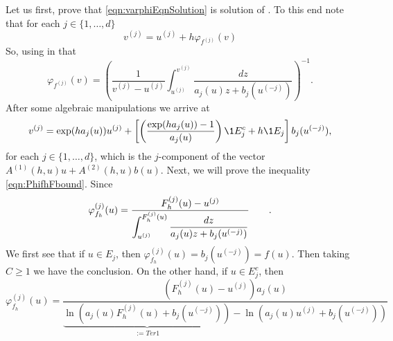 \documentclass[3p]{elsarticle}
\theoremstyle{definition}
\theoremstyle{plain}%
\theoremstyle{remark}
\newcommand{\SM}{LS\xspace}
\begin{document}
\begin{pf}
	Let us first, prove that \eqref{eqn:varphiEqnSolution} is solution of . To this end note 
	that for each $j\in \{1,\dots, d\}$
	\begin{equation*}
		v^{(j)} = u^{(j)} + h \varphi_{f^{(j)}}(v)	
	\end{equation*}
	So, using in   that
	\begin{equation}
		\varphi_{f^{(j)}}(v) =
			\left(
				\frac{1}{v^{(j)}-u^{(j)}}
				\int 
				_{u^{(j)}}^{v^{(j)}}
				\frac{dz}
				{
					a_{j}(u) z
					+b_{j}(u^{(-j)})
				}
				\right)^{-1}.
	\end{equation} 
	After some algebraic manipulations we arrive at
%	
	\begin{equation}
		v^{(j)}= \exp(h a_j(u)) u^{(j)} + 
		\left[
			\left(
				\frac{\exp(ha_j(u))-1}{a_j(u)}
			\right)
			\1{E_j^c}
			+h \1{E_j}
		\right]b_{j}(u^{(-j)}),
	\end{equation}	
	for each $j\in \{1,\dots, d\}$, which is the $j$-component of the vector
	$A^{(1)}(h,u)u +A^{(2)}(h,u) b(u)$.
	Next, we will prove the inequality \eqref{eqn:PhifhFbound}. Since 
	$$
		\varphi_{f_h}^{(j)}(u) = 
			\frac{
				F_h^{(j)}(u)-u^{(j)}
			}%
			{%
				\displaystyle
				\int_{u^{(j)}}^{F_h^{(j)}(u)}
				\frac{dz}{a_j(u)z + b_j(u^{(-j)})}
			} \qquad.
	$$
	We first see that if $u\in E_j$, then 
	$
		\varphi_{f_h}^{(j)}(u) = b_j(u^{(-j)}) = f(u).
	$
	Then taking $C\geq 1$ we have the conclusion.
	On the other hand, if $u\in E_j^c$, then
	\begin{equation}\label{eqn:VarPhiEjc}
		\varphi_{f_h}^{(j)}(u) =
		\frac{
				(F_h^{(j)}(u)-u^{(j)}) a_j(u)
			}
			{
				\underbrace{
				\ln \left(
					a_j(u) F_h^{(j)}(u) + b_j(u^{(-j)})
				\right)
				}_{:=Ter1}
				-
				\ln \left(
					a_j(u) u^{(j)} + b_j(u^{(-j)})
				\right)
			}		
	\end{equation}

\end{pf}
\end{document}
